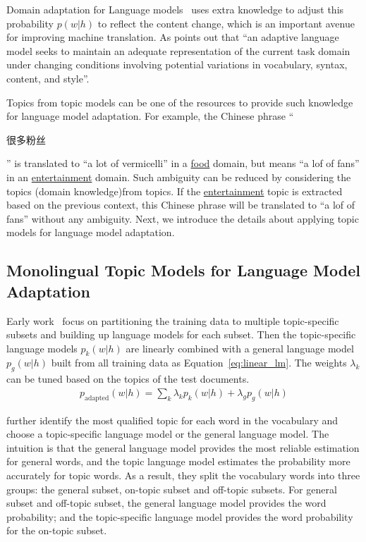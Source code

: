 Domain adaptation for Language models~\citep{Bellegarda-04,wood-09}
uses extra knowledge to adjust this probability $p(w|h)$ to reflect
the content change, which is an important avenue for improving machine
translation. As \citet{Bellegarda-04} points out that ``an adaptive
language model seeks to maintain an adequate representation of the
current task domain under changing conditions involving potential
variations in vocabulary, syntax, content, and style''.

Topics from topic models can be one of the resources to provide such
knowledge for language model adaptation. For example, the Chinese
phrase ``\begin{CJK*}{UTF8}{gbsn}很多粉丝\end{CJK*}'' is translated to
  ``a lot of vermicelli'' in a \underline{food} domain, but means ``a
  lof of fans'' in an \underline{entertainment} domain. Such ambiguity
  can be reduced by considering the topics (domain knowledge)from
  topics. If the \underline{entertainment} topic is extracted based on
  the previous context, this Chinese phrase will be translated to ``a
  lof of fans'' without any ambiguity. Next, we introduce the details
  about applying topic models for language model adaptation.


\subsection{Monolingual Topic Models for Language Model Adaptation}

Early work~\citet{Clarkson-1997,Seymore-1997,Kneser-1997,Iyer-1999} focus on
partitioning the training data to multiple topic-specific subsets and
building up language models for each subset. Then the topic-specific
language models $p_k(w|h)$ are linearly combined with a general
language model $p_g(w|h)$ built from all training data as
Equation~\ref{eq:linear_lm}. The weights $\lambda_k$ can be tuned
based on the topics of the test documents.
\begin{align}
\label{eq:linear_lm}
p_\textrm{adapted}(w|h) = \sum_k \lambda_k p_k(w|h) + \lambda_g p_g(w|h)
\end{align}

\citet{Seymore-1998} further identify the most qualified topic for
each word in the vocabulary and choose a topic-specific language model
or the general language model. The intuition is that the general
language model provides the most reliable estimation for general
words, and the topic language model estimates the probability more
accurately for topic words. As a result, they split the vocabulary
words into three groups: the general subset, on-topic subset and
off-topic subsets. For general subset and off-topic subset, the
general language model provides the word probability; and the
topic-specific language model provides the word probability for the
on-topic subset.

